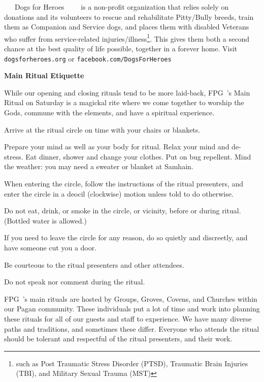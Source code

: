 \documentclass[9pt,twoside,openright,final,article]{memoir}
\def\fpg{{\beltanefamily FPG\ }}
\renewcommand{\subsection}[1]{%
  \vspace{6pt}%
  \needspace{1.25in}%
  \begin{center}\textbf{\Large \beltanefamily #1}\end{center}

  \nopagebreak}
\renewcommand{\subsubsection}[1]{%
  \vspace{1pt}\needspace{1.5in}
  {\large ~~~\beltanefamily #1~~~\ }
  \nopagebreak}
\begin{document}
\begin{multicols}{2}
  \subsubsection{Dogs for Heroes} is a non-profit organization that
  relies solely on donations and its volunteers to rescue and
  rehabilitate Pitty/Bully breeds, train them as Companion and Service
  dogs, and places them with disabled Veterans who suffer from
  service-related injuries/illness\footnote{such as Post Traumatic
    Stress Disorder (PTSD), Traumatic Brain Injuries (TBI), and
    Military Sexual Trauma (MST)}.  This gives them both a second
  chance at the best quality of life possible, together in a forever
  home.  Visit \texttt{dogsforheroes.org} or
  \texttt{facebook.com/DogsForHeroes}


  \subsection{Main Ritual Etiquette}

  While our opening and closing rituals tend to be more laid-back,
  \fpg's Main Ritual on Saturday is a magickal rite where we come
  together to worship the Gods, commune with the elements, and have a
  spiritual experience.

  Arrive at the ritual circle on time with your chairs or blankets.

  Prepare your mind as well as your body for ritual. Relax your mind and
  de-stress. Eat dinner, shower and change your clothes. Put on bug
  repellent. Mind the weather: you may need a sweater or blanket at
  Samhain.

  When entering the circle, follow the instructions of the ritual
  presenters, and enter the circle in a deocil (clockwise) motion
  unless told to do otherwise.

  Do not eat, drink, or smoke in the circle, or vicinity, before or
  during ritual. (Bottled water is allowed.)

  If you need to leave the circle for any reason, do so quietly and
  discreetly, and have someone cut you a door.

  Be courteous to the ritual presenters and other attendees.

  Do not speak nor comment during the ritual.

  \fpg's main rituals are hosted by Groups, Groves, Covens, and
  Churches within our Pagan community. These individuals put a lot of
  time and work into planning these rituals for all of our guests and
  staff to experience. We have many diverse paths and traditions, and
  sometimes these differ. Everyone who attends the ritual should be
  tolerant and respectful of the ritual presenters, and their work.



\end{multicols}
\end{document}
